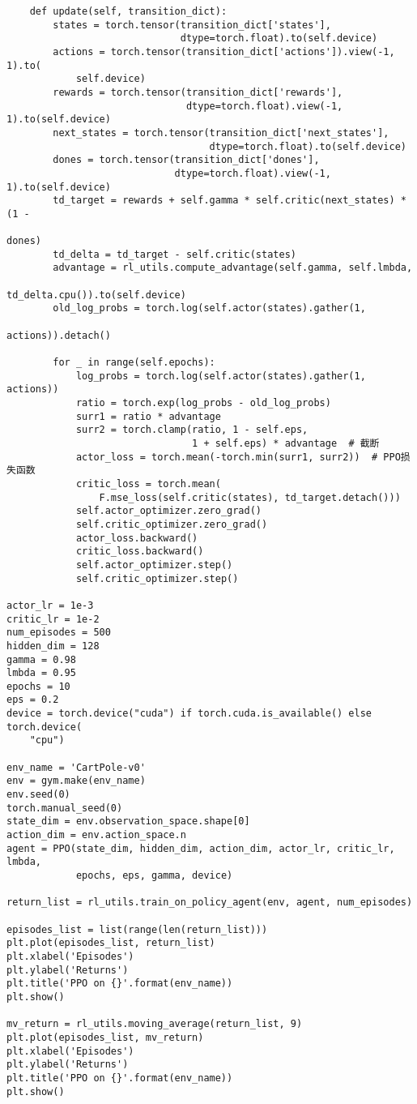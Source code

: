 \begin{lstlisting}
    def update(self, transition_dict):
        states = torch.tensor(transition_dict['states'],
                              dtype=torch.float).to(self.device)
        actions = torch.tensor(transition_dict['actions']).view(-1, 1).to(
            self.device)
        rewards = torch.tensor(transition_dict['rewards'],
                               dtype=torch.float).view(-1, 1).to(self.device)
        next_states = torch.tensor(transition_dict['next_states'],
                                   dtype=torch.float).to(self.device)
        dones = torch.tensor(transition_dict['dones'],
                             dtype=torch.float).view(-1, 1).to(self.device)
        td_target = rewards + self.gamma * self.critic(next_states) * (1 -
                                                                       dones)
        td_delta = td_target - self.critic(states)
        advantage = rl_utils.compute_advantage(self.gamma, self.lmbda,
                                               td_delta.cpu()).to(self.device)
        old_log_probs = torch.log(self.actor(states).gather(1,
                                                            actions)).detach()

        for _ in range(self.epochs):
            log_probs = torch.log(self.actor(states).gather(1, actions))
            ratio = torch.exp(log_probs - old_log_probs)
            surr1 = ratio * advantage
            surr2 = torch.clamp(ratio, 1 - self.eps,
                                1 + self.eps) * advantage  # 截断
            actor_loss = torch.mean(-torch.min(surr1, surr2))  # PPO损失函数
            critic_loss = torch.mean(
                F.mse_loss(self.critic(states), td_target.detach()))
            self.actor_optimizer.zero_grad()
            self.critic_optimizer.zero_grad()
            actor_loss.backward()
            critic_loss.backward()
            self.actor_optimizer.step()
            self.critic_optimizer.step()

actor_lr = 1e-3
critic_lr = 1e-2
num_episodes = 500
hidden_dim = 128
gamma = 0.98
lmbda = 0.95
epochs = 10
eps = 0.2
device = torch.device("cuda") if torch.cuda.is_available() else torch.device(
    "cpu")

env_name = 'CartPole-v0'
env = gym.make(env_name)
env.seed(0)
torch.manual_seed(0)
state_dim = env.observation_space.shape[0]
action_dim = env.action_space.n
agent = PPO(state_dim, hidden_dim, action_dim, actor_lr, critic_lr, lmbda,
            epochs, eps, gamma, device)

return_list = rl_utils.train_on_policy_agent(env, agent, num_episodes)

episodes_list = list(range(len(return_list)))
plt.plot(episodes_list, return_list)
plt.xlabel('Episodes')
plt.ylabel('Returns')
plt.title('PPO on {}'.format(env_name))
plt.show()

mv_return = rl_utils.moving_average(return_list, 9)
plt.plot(episodes_list, mv_return)
plt.xlabel('Episodes')
plt.ylabel('Returns')
plt.title('PPO on {}'.format(env_name))
plt.show()
\end{lstlisting}

